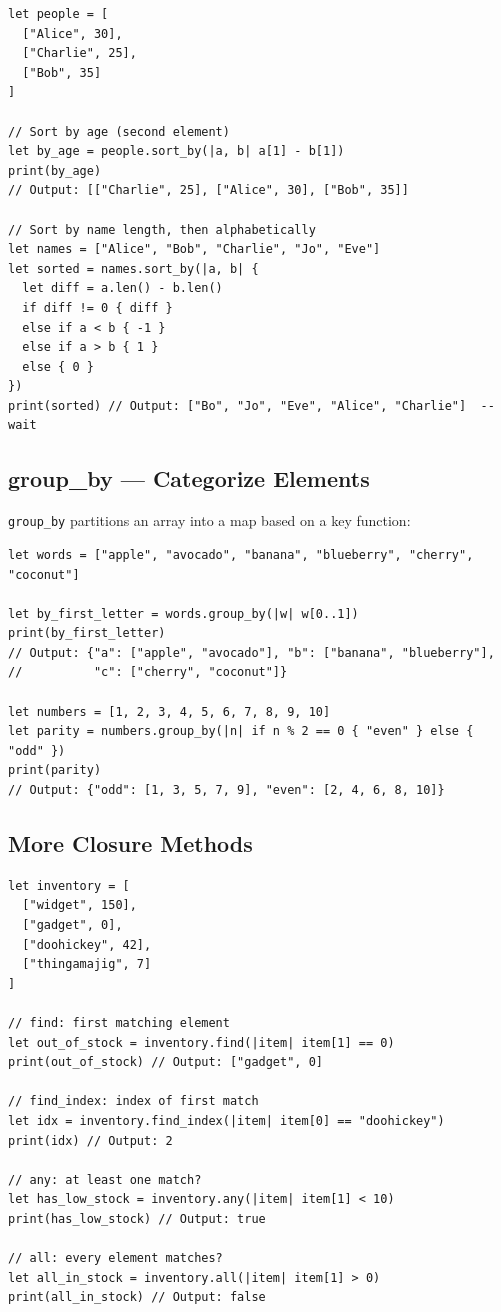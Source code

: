 \begin{lstlisting}[language=Lattice, caption={Custom sorting}]
let people = [
  ["Alice", 30],
  ["Charlie", 25],
  ["Bob", 35]
]

// Sort by age (second element)
let by_age = people.sort_by(|a, b| a[1] - b[1])
print(by_age)
// Output: [["Charlie", 25], ["Alice", 30], ["Bob", 35]]

// Sort by name length, then alphabetically
let names = ["Alice", "Bob", "Charlie", "Jo", "Eve"]
let sorted = names.sort_by(|a, b| {
  let diff = a.len() - b.len()
  if diff != 0 { diff }
  else if a < b { -1 }
  else if a > b { 1 }
  else { 0 }
})
print(sorted) // Output: ["Bo", "Jo", "Eve", "Alice", "Charlie"]  -- wait
\end{lstlisting}

\subsection{group\_by --- Categorize Elements}\label{sec:array-group-by}

\lstinline|group_by| partitions an array into a map based on a key function:

\begin{lstlisting}[language=Lattice, caption={Grouping elements}]
let words = ["apple", "avocado", "banana", "blueberry", "cherry", "coconut"]

let by_first_letter = words.group_by(|w| w[0..1])
print(by_first_letter)
// Output: {"a": ["apple", "avocado"], "b": ["banana", "blueberry"],
//          "c": ["cherry", "coconut"]}

let numbers = [1, 2, 3, 4, 5, 6, 7, 8, 9, 10]
let parity = numbers.group_by(|n| if n % 2 == 0 { "even" } else { "odd" })
print(parity)
// Output: {"odd": [1, 3, 5, 7, 9], "even": [2, 4, 6, 8, 10]}
\end{lstlisting}

\subsection{More Closure Methods}\label{sec:more-closure-methods}

\begin{lstlisting}[language=Lattice, caption={find, any, all}]
let inventory = [
  ["widget", 150],
  ["gadget", 0],
  ["doohickey", 42],
  ["thingamajig", 7]
]

// find: first matching element
let out_of_stock = inventory.find(|item| item[1] == 0)
print(out_of_stock) // Output: ["gadget", 0]

// find_index: index of first match
let idx = inventory.find_index(|item| item[0] == "doohickey")
print(idx) // Output: 2

// any: at least one match?
let has_low_stock = inventory.any(|item| item[1] < 10)
print(has_low_stock) // Output: true

// all: every element matches?
let all_in_stock = inventory.all(|item| item[1] > 0)
print(all_in_stock) // Output: false
\end{lstlisting}

